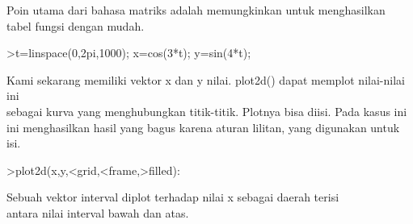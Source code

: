 \documentclass[a4paper,10pt]{article}
\begin{document}
\begin{eulernotebook}
\begin{eulercomment}
\begin{eulercomment}
\begin{eulercomment}
\begin{eulercomment}
\begin{eulercomment}
\begin{eulercomment}
\begin{eulercomment}
\begin{eulercomment}
\begin{eulerprompt}
\end{eulerprompt}
\begin{eulercomment}
Poin utama dari bahasa matriks adalah memungkinkan untuk menghasilkan
tabel fungsi dengan mudah.
\end{eulercomment}
\begin{eulerprompt}
>t=linspace(0,2pi,1000); x=cos(3*t); y=sin(4*t);
\end{eulerprompt}
\begin{eulercomment}
Kami sekarang memiliki vektor x dan y nilai. plot2d() dapat memplot
nilai-nilai ini\\
sebagai kurva yang menghubungkan titik-titik. Plotnya bisa diisi. Pada
kasus ini\\
ini menghasilkan hasil yang bagus karena aturan lilitan, yang
digunakan untuk\\
isi.
\end{eulercomment}
\begin{eulerprompt}
>plot2d(x,y,<grid,<frame,>filled):
\end{eulerprompt}
\begin{eulercomment}
Sebuah vektor interval diplot terhadap nilai x sebagai daerah terisi\\
antara nilai interval bawah dan atas.


\end{eulercomment}
\end{eulercomment}
\end{eulercomment}
\end{eulercomment}
\end{eulercomment}
\end{eulercomment}
\end{eulercomment}
\end{eulercomment}
\end{eulercomment}
\end{eulernotebook}
\end{document}
